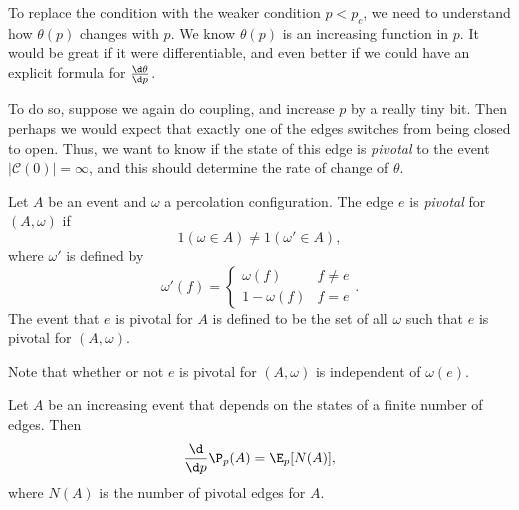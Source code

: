 \documentclass[a4paper]{article}
\begin{document}
To replace the condition with the weaker condition $p < p_c$, we need to understand how $\theta(p)$ changes with $p$. We know $\theta(p)$ is an increasing function in $p$. It would be great if it were differentiable, and even better if we could have an explicit formula for $\frac{\d \theta}{\d p}$.

To do so, suppose we again do coupling, and increase $p$ by a really tiny bit. Then perhaps we would expect that exactly one of the edges switches from being closed to open. Thus, we want to know if the state of this edge is \emph{pivotal} to the event $|\mathcal{C}(0)| = \infty$, and this should determine the rate of change of $\theta$.

\begin{defi}
  Let $A$ be an event and $\omega$ a percolation configuration. The edge $e$ is \emph{pivotal} for $(A, \omega)$ if
  \[
    1(\omega \in A) \not= 1(\omega' \in A),
  \]
  where $\omega'$ is defined by
  \[
    \omega'(f) = 
    \begin{cases}
      \omega(f) & f \not= e\\
      1 - \omega(f) & f = e
    \end{cases}.
  \]
  The event that $e$ is pivotal for $A$ is defined to be the set of all $\omega$ such that $e$ is pivotal for $(A, \omega)$.
\end{defi}
Note that whether or not $e$ is pivotal for $(A, \omega)$ is independent of $\omega(e)$.

\begin{thm}
  Let $A$ be an increasing event that depends on the states of a finite number of edges. Then
  \[
    \frac{\d}{\d p} \P_p(A) = \E_p[N(A)],
  \]
  where $N(A)$ is the number of pivotal edges for $A$.
\end{thm}
\end{document}
